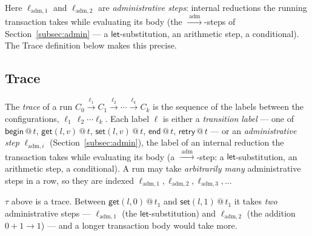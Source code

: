 \documentclass[manuscript,nonacm]{acmart}
\makeatletter
\theoremstyle{acmdefinition}
\newcommand{\bbegin}{\textsf{begin}}
\newcommand{\eend}{\textsf{end}}
\newcommand{\retry}{\textsf{retry}}
\newcommand{\getev}[3]{\textsf{get}(#1,#2)\,@\,#3}
\newcommand{\setev}[3]{\textsf{set}(#1,#2)\,@\,#3}
\newcommand{\adm}{\xrightarrow{\;\mathrm{adm}\;}}     %
\newcommand{\ladm}[1][]{\ell_{\mathrm{adm}#1}}       %
\makeatother
\begin{document}
Here $\ladm[,1]$ and $\ladm[,2]$ are \emph{administrative steps}: internal reductions the
running transaction takes while evaluating its body (the $\adm$-steps of
Section~\ref{subsec:admin} --- a $\textsf{let}$-substitution, an arithmetic step, a
conditional). The Trace definition below makes this precise.

\subsection{Trace}
\begin{definition}[Trace]
The \emph{trace} of a run $C_0 \xrightarrow{\ell_1} C_1 \xrightarrow{\ell_2} \cdots
\xrightarrow{\ell_k} C_k$ is the sequence of the labels between the
configurations, $\ell_1\,\ell_2\cdots\ell_k$. Each label $\ell$ is either a
\emph{transition label} --- one of $\bbegin\,@\,t$, $\getev{l}{v}{t}$,
$\setev{l}{v}{t}$, $\eend\,@\,t$, $\retry\,@\,t$ --- or an \emph{administrative
step} $\ladm[,i]$ (Section~\ref{subsec:admin}), the label of an internal reduction the transaction takes while
evaluating its body (a $\adm$-step: a $\textsf{let}$-substitution, an arithmetic
step, a conditional). A run may take \emph{arbitrarily many} administrative steps
in a row, so they are indexed $\ladm[,1], \ladm[,2], \ladm[,3], \dots$
\end{definition}

\begin{example}
$\tau$ above is a trace. Between $\getev{l}{0}{t_1}$ and $\setev{l}{1}{t_1}$ it
takes \emph{two} administrative steps --- $\ladm[,1]$ (the $\textsf{let}$-substitution)
and $\ladm[,2]$ (the addition $0+1 \to 1$) --- and a longer transaction body would
take more.
\end{example}
\end{document}
